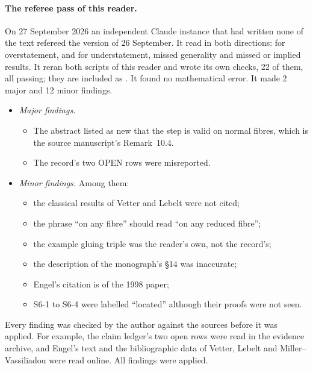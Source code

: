 \paragraph{The referee pass of this reader.}
On 27 September 2026 an independent Claude instance that had written none of the text refereed the version of 26 September. It read in both directions: for overstatement, and for understatement, missed generality and missed or implied results. It reran both scripts of this reader and wrote its own checks, 22 of them, all passing; they are included as . It found no mathematical error. It made 2 major and 12 minor findings.
\begin{itemize}
\item \emph{Major findings.}
\begin{itemize}
\item The abstract listed as new that the step is valid on normal fibres, which is the source manuscript's Remark~10.4.
\item The record's two \textsf{OPEN} rows were misreported.
\end{itemize}
\item \emph{Minor findings.} Among them:
\begin{itemize}
\item the classical results of Vetter and Lebelt were not cited;
\item the phrase ``on any fibre'' should read ``on any reduced fibre'';
\item the example gluing triple was the reader's own, not the record's;
\item the description of the monograph's §14 was inaccurate;
\item Engel's citation is of the 1998 paper;
\item S6-1 to S6-4 were labelled ``located'' although their proofs were not seen.
\end{itemize}
\end{itemize}
Every finding was checked by the author against the sources before it was applied. For example, the claim ledger's two open rows were read in the evidence archive, and Engel's text and the bibliographic data of Vetter, Lebelt and Miller--Vassiliadou were read online. All findings were applied.


